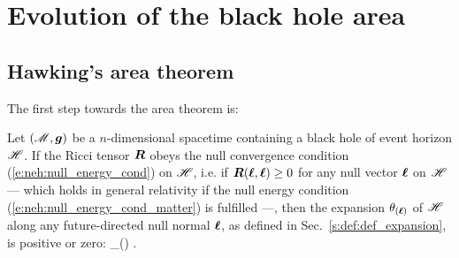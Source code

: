 
\section{Evolution of the black hole area}

\subsection{Hawking's area theorem}

The first step towards the area theorem is:

\begin{prop}
\label{p:evo:positive_expansion}
Let $(\mathscr{M},\bm{g})$ be a $n$-dimensional spacetime containing a black hole
of event horizon $\mathscr{H}$. If the Ricci tensor $\bm{R}$ obeys the null
convergence condition (\ref{e:neh:null_energy_cond}) on $\mathscr{H}$, i.e. if
$\bm{R}(\bm{\ell}, \bm{\ell}) \geq 0$ for any null vector $\bm{\ell}$ on $\mathscr{H}$
--- which holds in general relativity if the null energy condition (\ref{e:neh:null_energy_cond_matter}) is fulfilled ---, then the
expansion $\theta_{(\bm{\ell})}$ of $\mathscr{H}$ along any future-directed null
normal $\bm{\ell}$, as defined in Sec.~\ref{s:def:def_expansion}, is positive or zero:
\be \label{e:evo:theta_positive}
    \theta_{(\wl)}  .
\ee
\end{prop}
